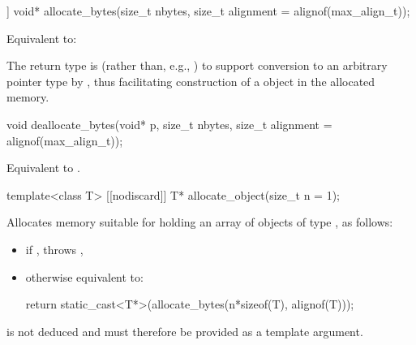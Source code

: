 %
\begin{itemdecl}
[[nodiscard]] void* allocate_bytes(size_t nbytes, size_t alignment = alignof(max_align_t));
\end{itemdecl}

\begin{itemdescr}
\pnum
\effects
Equivalent to: 

\pnum
\begin{note}
The return type is  (rather than, e.g., )
to support conversion to an arbitrary pointer type 
by , thus facilitating construction of a 
object in the allocated memory.
\end{note}
\end{itemdescr}

%
\begin{itemdecl}
void deallocate_bytes(void* p, size_t nbytes, size_t alignment = alignof(max_align_t));
\end{itemdecl}

\begin{itemdescr}
\pnum
\effects
Equivalent to .
\end{itemdescr}

%
\begin{itemdecl}
template<class T>
  [[nodiscard]] T* allocate_object(size_t n = 1);
\end{itemdecl}

\begin{itemdescr}
\pnum
\effects
Allocates memory suitable for holding
an array of  objects of type , as follows:
\begin{itemize}
\item
  if ,
  throws ,
\item
  otherwise equivalent to:
\begin{codeblock}
return static_cast<T*>(allocate_bytes(n*sizeof(T), alignof(T)));
\end{codeblock}
\end{itemize}

\pnum
\begin{note}
 is not deduced and must therefore be provided as a template argument.
\end{note}
\end{itemdescr}

